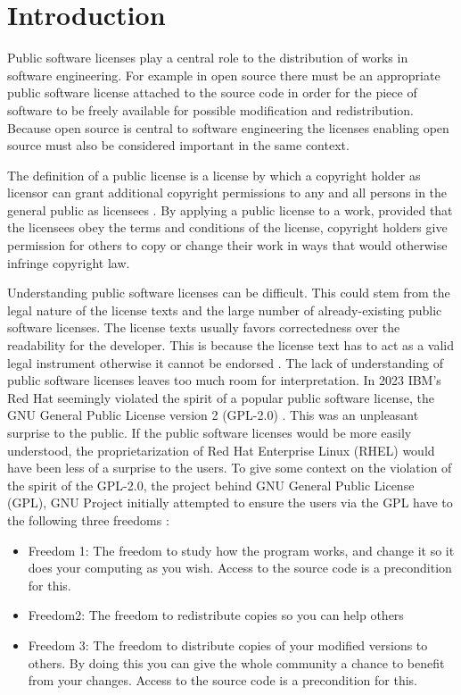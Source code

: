 \chapter{Introduction\label{intro}}
Public software licenses play a central role to the distribution of works in software engineering. For example in open source there must be an appropriate public software license attached to the source code in order for the piece of software to be freely available for possible modification and redistribution. Because open source is central to software engineering the licenses enabling open source must also be considered important in the same context.

The definition of a public license is a license by which a copyright holder as licensor can grant additional copyright permissions to any and all persons in the general public as licensees \citep{hietanen2007license}. By applying a public license to a work, provided that the licensees obey the terms and conditions of the license, copyright holders give permission for others to copy or change their work in ways that would otherwise infringe copyright law.

Understanding public software licenses can be difficult. This could stem from the legal nature of the license texts and the large number of already-existing public software licenses. The license texts usually favors correctedness over the readability for the developer. This is because the license text has to act as a valid legal instrument otherwise it cannot be endorsed \citep{ferguson2006gpl}. The lack of understanding of public software licenses leaves too much room for interpretation. In 2023 IBM's Red Hat seemingly violated the spirit of a popular public software license, the GNU General Public License version 2 (GPL-2.0) \citep{ibm:rhel, sfc:rhel}. This was an unpleasant surprise to the public. If the public software licenses would be more easily understood, the proprietarization of Red Hat Enterprise Linux (RHEL) would have been less of a surprise to the users. To give some context on the violation of the spirit of the GPL-2.0, the project behind GNU General Public License (GPL), GNU Project initially attempted to ensure the users via the GPL have to the following three freedoms \citep{gnu:free}:
\begin{itemize}
	\item Freedom 1:	The freedom to study how the program works, and change it so it does your computing as you wish. Access to the source code is a precondition for this.
	\item Freedom2: The freedom to redistribute copies so you can help others
	\item Freedom 3:	The freedom to distribute copies of your modified versions to others. By doing this you can give the whole community a chance to benefit from your changes. Access to the source code is a precondition for this.
\end{itemize}

